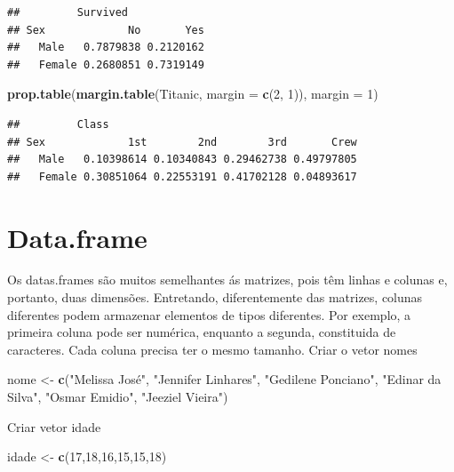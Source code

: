 \documentclass[]{book}
\newenvironment{Shaded}{\begin{snugshade}}{\end{snugshade}}
\newcommand{\DataTypeTok}[1]{\textcolor[rgb]{0.13,0.29,0.53}{#1}}
\newcommand{\DecValTok}[1]{\textcolor[rgb]{0.00,0.00,0.81}{#1}}
\newcommand{\KeywordTok}[1]{\textcolor[rgb]{0.13,0.29,0.53}{\textbf{#1}}}
\newcommand{\NormalTok}[1]{#1}
\newcommand{\StringTok}[1]{\textcolor[rgb]{0.31,0.60,0.02}{#1}}
\begin{document}
\begin{verbatim}
##         Survived
## Sex             No       Yes
##   Male   0.7879838 0.2120162
##   Female 0.2680851 0.7319149
\end{verbatim}

\begin{Shaded}
\begin{Highlighting}[]
\KeywordTok{prop.table}\NormalTok{(}\KeywordTok{margin.table}\NormalTok{(Titanic, }\DataTypeTok{margin =} \KeywordTok{c}\NormalTok{(}\DecValTok{2}\NormalTok{, }\DecValTok{1}\NormalTok{)), }\DataTypeTok{margin =} \DecValTok{1}\NormalTok{)}
\end{Highlighting}
\end{Shaded}

\begin{verbatim}
##         Class
## Sex             1st        2nd        3rd       Crew
##   Male   0.10398614 0.10340843 0.29462738 0.49797805
##   Female 0.30851064 0.22553191 0.41702128 0.04893617
\end{verbatim}

\hypertarget{data.frame}{%
\section{Data.frame}\label{data.frame}}

Os datas.frames são muitos semelhantes ás matrizes, pois têm linhas e colunas e, portanto, duas dimensões. Entretando, diferentemente das matrizes, colunas diferentes podem armazenar elementos de tipos diferentes. Por exemplo, a primeira coluna pode ser numérica, enquanto a segunda, constituida de caracteres. Cada coluna precisa ter o mesmo tamanho.
Criar o vetor nomes

\begin{Shaded}
\begin{Highlighting}[]
\NormalTok{nome <-}\StringTok{ }\KeywordTok{c}\NormalTok{(}\StringTok{"Melissa José"}\NormalTok{,}
          \StringTok{"Jennifer Linhares"}\NormalTok{,}
          \StringTok{"Gedilene Ponciano"}\NormalTok{,}
          \StringTok{"Edinar da Silva"}\NormalTok{,}
          \StringTok{"Osmar Emidio"}\NormalTok{,}
          \StringTok{"Jeeziel Vieira"}\NormalTok{)}
\end{Highlighting}
\end{Shaded}

Criar vetor idade

\begin{Shaded}
\begin{Highlighting}[]
\NormalTok{idade <-}\StringTok{ }\KeywordTok{c}\NormalTok{(}\DecValTok{17}\NormalTok{,}\DecValTok{18}\NormalTok{,}\DecValTok{16}\NormalTok{,}\DecValTok{15}\NormalTok{,}\DecValTok{15}\NormalTok{,}\DecValTok{18}\NormalTok{)}
\end{Highlighting}
\end{Shaded}
\end{document}
